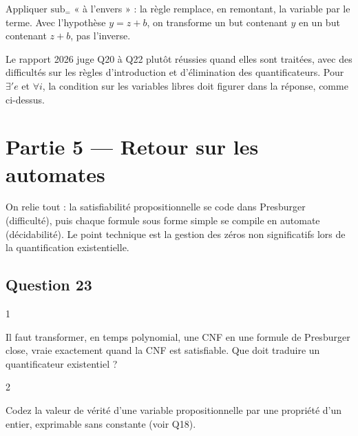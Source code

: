 \documentclass[11pt,a4paper]{article}
\begin{document}
\begin{piege}

Appliquer \({\mathrm{sub}}_=\) « à l'envers » : la règle remplace, en remontant, la variable par le terme. Avec l'hypothèse \(y=z+b\), on transforme un but contenant \(y\) en un but contenant \(z+b\), pas l'inverse.

\end{piege}

\begin{jury}

Le rapport 2026 juge Q20 à Q22 plutôt réussies quand elles sont traitées, avec des difficultés sur les règles d'introduction et d'élimination des quantificateurs. Pour \(\exists' e\) et \(\forall i\), la condition sur les variables libres doit figurer dans la réponse, comme ci-dessus.

\end{jury}

\hypertarget{partie-5-retour-sur-les-automates}{%
\section{Partie 5 --- Retour sur les automates}\label{partie-5-retour-sur-les-automates}}

On relie tout : la satisfiabilité propositionnelle se code dans Presburger (difficulté), puis chaque formule sous forme simple se compile en automate (décidabilité). Le point technique est la gestion des zéros non significatifs lors de la quantification existentielle.

\hypertarget{question-23}{%
\subsection{Question 23}\label{question-23}}

\begin{indication}{1}

Il faut transformer, en temps polynomial, une CNF en une formule de Presburger close, vraie exactement quand la CNF est satisfiable. Que doit traduire un quantificateur existentiel ?

\end{indication}

\begin{indication}{2}

Codez la valeur de vérité d'une variable propositionnelle par une propriété d'un entier, exprimable sans constante (voir Q18).

\end{indication}
\end{document}
